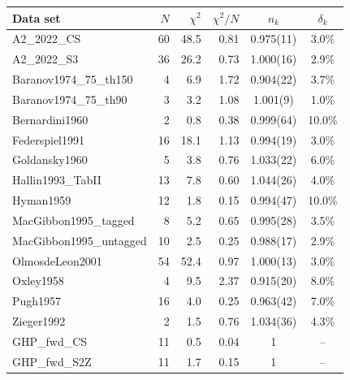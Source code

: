\begin{tabular}{lrrrcc}
\hline
Data set & $N$ & $\chi^2$ & $\chi^2/N$ & $n_k$ & $\delta_k$ \\
\hline
A2\_2022\_CS & 60 & 48.5 & 0.81 & 0.975(11) & 3.0\% \\
A2\_2022\_S3 & 36 & 26.2 & 0.73 & 1.000(16) & 2.9\% \\
Baranov1974\_75\_th150 & 4 & 6.9 & 1.72 & 0.904(22) & 3.7\% \\
Baranov1974\_75\_th90 & 3 & 3.2 & 1.08 & 1.001(9) & 1.0\% \\
Bernardini1960 & 2 & 0.8 & 0.38 & 0.999(64) & 10.0\% \\
Federspiel1991 & 16 & 18.1 & 1.13 & 0.994(19) & 3.0\% \\
Goldansky1960 & 5 & 3.8 & 0.76 & 1.033(22) & 6.0\% \\
Hallin1993\_TabII & 13 & 7.8 & 0.60 & 1.044(26) & 4.0\% \\
Hyman1959 & 12 & 1.8 & 0.15 & 0.994(47) & 10.0\% \\
MacGibbon1995\_tagged & 8 & 5.2 & 0.65 & 0.995(28) & 3.5\% \\
MacGibbon1995\_untagged & 10 & 2.5 & 0.25 & 0.988(17) & 2.9\% \\
OlmosdeLeon2001 & 54 & 52.4 & 0.97 & 1.000(13) & 3.0\% \\
Oxley1958 & 4 & 9.5 & 2.37 & 0.915(20) & 8.0\% \\
Pugh1957 & 16 & 4.0 & 0.25 & 0.963(42) & 7.0\% \\
Zieger1992 & 2 & 1.5 & 0.76 & 1.034(36) & 4.3\% \\
GHP\_fwd\_CS & 11 & 0.5 & 0.04 & 1 & -- \\
GHP\_fwd\_S2Z & 11 & 1.7 & 0.15 & 1 & -- \\
\hline
\end{tabular}

